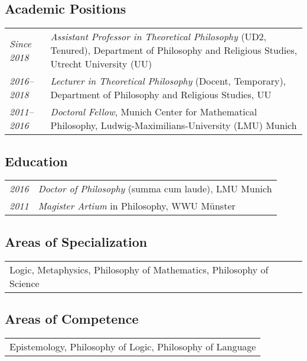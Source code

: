 \subsection*{Academic Positions}

\begin{tabular}{l p{.8\linewidth}}
  \emph{Since 2018} & \emph{Assistant Professor in Theoretical
                      Philosophy} (UD2, Tenured), Department of
                      Philosophy and Religious Studies, Utrecht
                      University (UU)\\[1ex]
  \emph{2016--2018} & \emph{Lecturer in Theoretical Philosophy} (Docent,
                      Temporary), Department of Philosophy and Religious
                      Studies, UU\\[1ex]
  \emph{2011--2016} & \emph{Doctoral Fellow}, Munich Center for
                      Mathematical Philosophy,
                      Ludwig-Maximilians-University (LMU) Munich\\
\end{tabular}

\subsection*{Education}

\begin{tabular}{l p{.8\linewidth}}
  \emph{2016} & \emph{Doctor of Philosophy} (summa cum laude), LMU
                Munich\\[1ex]
  \emph{2011} & \emph{Magister Artium} in Philosophy, WWU M\"unster\\
\end{tabular}

\subsection*{Areas of Specialization}

\begin{tabular}{l}
  Logic, Metaphysics, Philosophy of Mathematics, Philosophy of Science
\end{tabular}

\subsection*{Areas of Competence}

\begin{tabular}{l}
  Epistemology, Philosophy of Logic, Philosophy of Language
\end{tabular}

